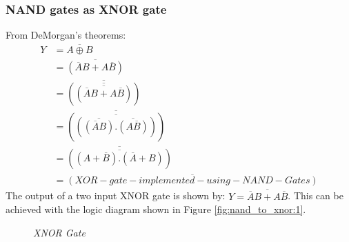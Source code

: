 		\subsubsection{NAND gates as XNOR gate}
			From DeMorgan’s theorems:
			\begin{align*}
				Y &= \overline{A \oplus B} \\
				&= \overline{(\overline{A}B + A\overline{B})} \\
				&= \overline{(\overline{(\overline{\overline{A}B + A\overline{B}})})} \\
				&= \overline{(\overline{(\overline{(\overline{A}B)} . \overline{(A\overline{B})})})} \\
				&= \overline{(\overline{(A+\overline{B}) . (\overline{A} + B)})} \\
				&= \overline{(XOR-gate-implemented-using-NAND-Gates)}
			\end{align*}
			The output of a two input XNOR gate is shown by: $Y = \overline{\overline{A}B + A\overline{B}}$. This can be achieved with the logic diagram shown in Figure \ref{fig:nand_to_xnor:1}.
			\begin{figure}[ht]
				\centering
				\hfill
				\caption{\textit{XNOR Gate}}
			\end{figure}
	
